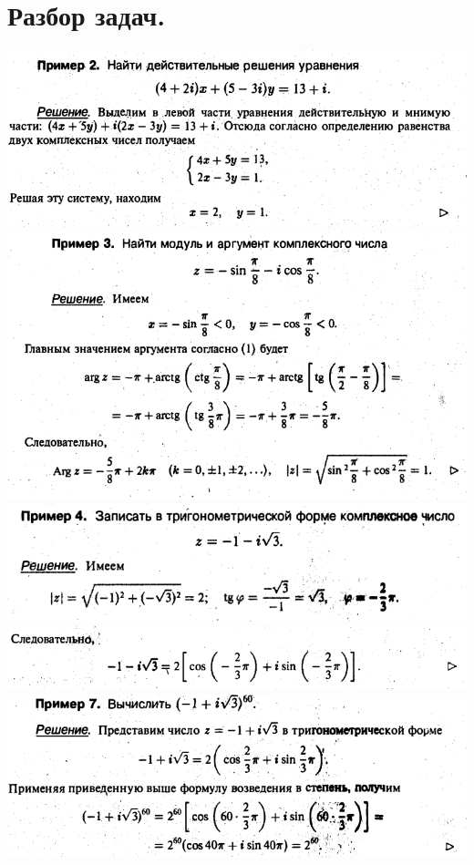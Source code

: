 \documentclass[a4paper, 12pt]{report}
\begin{document}
\section*{Разбор задач.}
\begin{center}
	\includegraphics[scale=1.1]{pic5.png}\\
	\includegraphics[scale=1.1]{pic6.png}\\
	\includegraphics[scale=1.1]{pic7.png}\\
	\includegraphics[scale=1.1]{pic8.png}\\
	\includegraphics[scale=1.1]{pic9.png}\\

\end{center}
\end{document}
